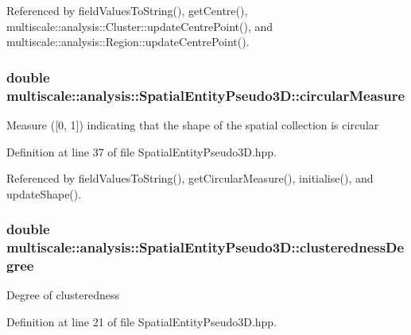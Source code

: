 Referenced by field\-Values\-To\-String(), get\-Centre(), multiscale\-::analysis\-::\-Cluster\-::update\-Centre\-Point(), and multiscale\-::analysis\-::\-Region\-::update\-Centre\-Point().

\hypertarget{classmultiscale_1_1analysis_1_1SpatialEntityPseudo3D_aa4ac170fb21e9697358d47ba6ea7a267}{
\subsubsection[{circular\-Measure}]{\setlength{\rightskip}{0pt plus 5cm}double multiscale\-::analysis\-::\-Spatial\-Entity\-Pseudo3\-D\-::circular\-Measure\hspace{0.3cm}{\ttfamily [protected]}}}\label{classmultiscale_1_1analysis_1_1SpatialEntityPseudo3D_aa4ac170fb21e9697358d47ba6ea7a267}
Measure (\mbox{[}0, 1\mbox{]}) indicating that the shape of the spatial collection is circular 

Definition at line 37 of file Spatial\-Entity\-Pseudo3\-D.\-hpp.



Referenced by field\-Values\-To\-String(), get\-Circular\-Measure(), initialise(), and update\-Shape().

\hypertarget{classmultiscale_1_1analysis_1_1SpatialEntityPseudo3D_a22a84312e7c497cc5fbc4d8b41d8fd45}{
\subsubsection[{clusteredness\-Degree}]{\setlength{\rightskip}{0pt plus 5cm}double multiscale\-::analysis\-::\-Spatial\-Entity\-Pseudo3\-D\-::clusteredness\-Degree\hspace{0.3cm}{\ttfamily [protected]}}}\label{classmultiscale_1_1analysis_1_1SpatialEntityPseudo3D_a22a84312e7c497cc5fbc4d8b41d8fd45}
Degree of clusteredness 

Definition at line 21 of file Spatial\-Entity\-Pseudo3\-D.\-hpp.



